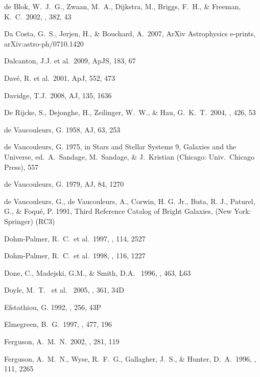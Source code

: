 \documentclass[12pt,preprint]{emulateapj}
\begin{document}
\begin{thebibliography}{}
 de Blok, W.~J.~G., 
Zwaan, M.~A., Dijkstra, M., Briggs, F.~H., \& Freeman, K.~C.\ 2002, \aap, 
382, 43 

Da Costa, G.~S., Jerjen, H., \& Bouchard, A.\ 2007, ArXiv Astrophysics e-prints, arXiv:astro-ph/0710.1420

Dalcanton, J.J. et al.\ 2009, ApJS, 183, 67 

Dav\'e, R. et al.\ 2001, ApJ, 552, 473

Davidge, T.J.\ 2008, AJ, 135, 1636

De Rijcke, S., Dejonghe, H., Zeilinger, W.~W., \& Hau, G.~K.~T.\ 2004, \aap, 426, 53 

de Vaucouleurs, G. 1958, AJ, 63, 253

de Vaucouleurs, G. 1975, in Stars and Stellar Systems 9, Galaxies
and the Universe, ed.\ A.\ Sandage, M.\ Sandage, \& J.\ Kristian
(Chicago: Univ.\ Chicago Press), 557

de Vaucouleurs, G. 1979, AJ, 84, 1270

de Vaucouleurs, G., de Vaucouleurs, A., Corwin, H. G. Jr.,
Buta, R. J., Paturel, G., \& Foqu\'e, P. 1991, Third Reference
Catalog of Bright Galaxies, (New York: Springer) (RC3)

Dohm-Palmer, R.~C.~et al.\ 1997, \aj, 114, 2527 

Dohm-Palmer, R.~C.~et al.\ 1998, \aj, 116, 1227 

Done, C., Madejski, G.M., \& Smith, D.A. \ 1996, \apj, 463, L63 

Doyle, M.~T. ~et al. \ 2005, \mnras, 361, 34D 

Efstathiou, G. 1992, \mnras, 256, 43P 

Elmegreen, B.~G.\ 1997, \apj, 477, 196 

Ferguson, A.~M.~N.\ 2002, \apss, 281, 119 

Ferguson, A.~M.~N., Wyse, R.~F.~G., Gallagher, J.~S., \& Hunter, D.~A.\ 
1996, \aj, 111, 2265 


\end{thebibliography}
\end{document}
